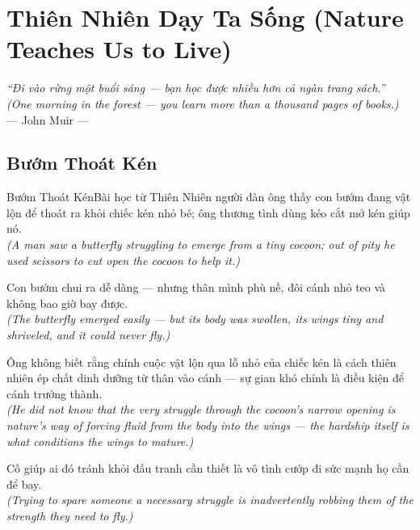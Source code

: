 \chapter{Thiên Nhiên Dạy Ta Sống (Nature Teaches Us to Live)}
\begin{center}
  \textit{\color{truyengold}``Đi vào rừng một buổi sáng --- bạn học được nhiều hơn cả ngàn trang sách.''}\\[4pt]
  \textit{(One morning in the forest --- you learn more than a thousand pages of books.)}\\[4pt]
  \small\color{truyenblue}--- John Muir ---
\end{center}
\ngancach

\section{Bướm Thoát Kén}
\begin{truyen}{Bướm Thoát Kén}{Bài học từ Thiên Nhiên}
 người đàn ông thấy con bướm đang vật lộn để thoát ra khỏi chiếc kén nhỏ bé; ông thương tình dùng kéo cắt mở kén giúp nó.\\[4pt]
\textit{(A man saw a butterfly struggling to emerge from a tiny cocoon; out of pity he used scissors to cut open the cocoon to help it.)}

Con bướm chui ra dễ dàng --- nhưng thân mình phù nề, đôi cánh nhỏ teo và không bao giờ bay được.\\[4pt]
\textit{(The butterfly emerged easily --- but its body was swollen, its wings tiny and shriveled, and it could never fly.)}

Ông không biết rằng chính cuộc vật lộn qua lỗ nhỏ của chiếc kén là cách thiên nhiên ép chất dinh dưỡng từ thân vào cánh --- sự gian khó chính là điều kiện để cánh trưởng thành.\\[4pt]
\textit{(He did not know that the very struggle through the cocoon's narrow opening is nature's way of forcing fluid from the body into the wings --- the hardship itself is what conditions the wings to mature.)}

\end{truyen}
\begin{baihoc}
  Cố giúp ai đó tránh khỏi đấu tranh cần thiết là vô tình cướp đi sức mạnh họ cần để bay.\\[4pt]
  \textit{(Trying to spare someone a necessary struggle is inadvertently robbing them of the strength they need to fly.)}
\end{baihoc}

